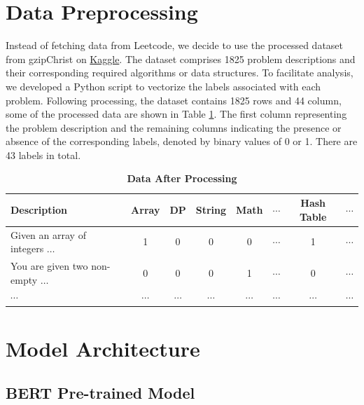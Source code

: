 \documentclass{article}
\begin{document}

\section{Data Preprocessing}
Instead of fetching data from Leetcode, we decide to use the processed dataset from gzipChrist\cite{DATA} on \href{https://www.kaggle.com/}{Kaggle}. The dataset comprises 1825 problem descriptions and their corresponding required algorithms or data structures. To facilitate analysis, we developed a Python script to vectorize the labels associated with each problem. Following processing, the dataset contains 1825 rows and 44 column, some of the processed data are shown in Table \ref{table:dataP}. The first column representing the problem description and the remaining columns indicating the presence or absence of the corresponding labels, denoted by binary values of 0 or 1. There are 43 labels in total.

\begin{table}[!h]
\centering
\caption{\textbf{Data After Processing}}
\begin{tabular}{ l c c c c c c c }
\toprule
\textbf{Description} & \textbf{Array} & \textbf{DP} & \textbf{String} & \textbf{Math} & \textbf{$\cdots$} & \textbf{Hash Table} & \textbf{$\cdots$}  \\ 
\midrule
Given an array of integers $\ldots$ & 1 & 0 & 0 & 0 & $\cdots$ & 1 & $\cdots$\\ 
You are given two non-empty $\ldots$ & 0 & 0 & 0 & 1 & $\cdots$ & 0 & $\cdots$ \\
$\cdots$ & $\cdots$ & $\cdots$ & $\cdots$ & $\cdots$ & $\cdots$ & $\cdots$ & $\cdots$\\
\bottomrule
\end{tabular}
\label{table:dataP}
\end{table}

\section{Model Architecture}

\subsection{BERT Pre-trained Model}
\end{document}
